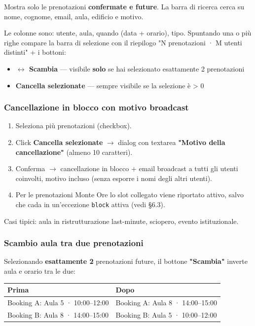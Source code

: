 \documentclass[11pt,a4paper]{article}
\begin{document}
Mostra solo le prenotazioni \textbf{confermate e future}. La barra di ricerca cerca su nome, cognome, email, aula, edificio e motivo.

Le colonne sono: utente, aula, quando (data + orario), tipo. Spuntando una o più righe compare la barra di selezione con il riepilogo "N prenotazioni · M utenti distinti" + i bottoni:

\begin{itemize}
  \item \textbf{$\leftrightarrow$ Scambia} --- visibile \textbf{solo} se hai selezionato esattamente 2 prenotazioni
  \item \textbf{\texttimes{} Cancella selezionate} --- sempre visibile se la selezione è \textgreater{} 0
\end{itemize}

\subsubsection{Cancellazione in blocco con motivo broadcast}


\begin{enumerate}
  \item Seleziona più prenotazioni (checkbox).
  \item Click \textbf{Cancella selezionate} $\rightarrow$ dialog con textarea \textbf{"Motivo della cancellazione"} (almeno 10 caratteri).
  \item Conferma $\rightarrow$ cancellazione in blocco + email broadcast a tutti gli utenti coinvolti, motivo incluso (senza esporre i nomi degli altri utenti).
  \item Per le prenotazioni Monte Ore lo slot collegato viene riportato attivo, salvo che cada in un'eccezione \texttt{block} attiva (vedi §6.3).
\end{enumerate}

Casi tipici: aula in ristrutturazione last-minute, sciopero, evento istituzionale.

\subsubsection{Scambio aula tra due prenotazioni}


Selezionando \textbf{esattamente 2} prenotazioni future, il bottone \textbf{"Scambia"} inverte aula e orario tra le due:

\begin{table}[H]
\centering
\small
\begin{tabularx}{\linewidth}{|X|X|}
\hline
\rowcolor{tableheader} Prima & Dopo \\
\hline
Booking A: Aula 5 · 10:00--12:00 & Booking A: Aula 8 · 14:00--15:00 \\
\hline
Booking B: Aula 8 · 14:00--15:00 & Booking B: Aula 5 · 10:00--12:00 \\
\hline
\end{tabularx}
\end{table}
\end{document}
